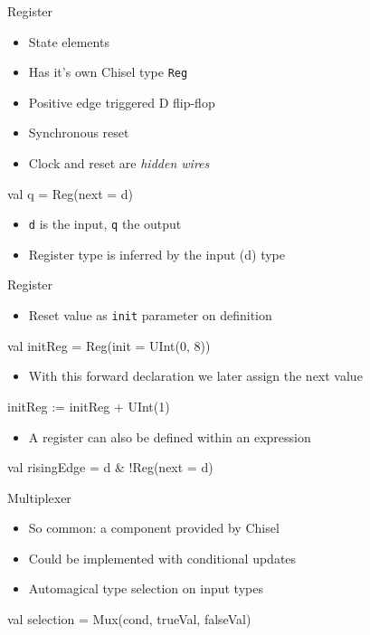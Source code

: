 \documentclass[xcolor=pdflatex,dvipsnames,table]{beamer}
\newcommand{\code}[1]{{\texttt{#1}}}
\begin{document}
\begin{frame}[fragile]{Register}
\begin{itemize}
\item State elements
\item Has it's own Chisel type \code{Reg}
\item Positive edge triggered D flip-flop
\item Synchronous reset
\item Clock and reset are \emph{hidden wires}
\end{itemize}
\begin{chisel}
val q = Reg(next = d)
\end{chisel}
\begin{itemize}
\item \code{d} is the input, \code{q} the output
\item Register type is inferred by the input (d) type
\end{itemize}
\end{frame}

\begin{frame}[fragile]{Register}
\begin{itemize}
\item Reset value as \code{init} parameter on definition
\end{itemize}
\begin{chisel}
val initReg = Reg(init = UInt(0, 8))
\end{chisel}
\begin{itemize}
\item With this forward declaration we later assign the next value
\end{itemize}
\begin{chisel}
initReg := initReg + UInt(1)
\end{chisel}
\begin{itemize}
\item A register can also be defined within an expression
\end{itemize}
\begin{chisel}
val risingEdge = d & !Reg(next = d)
\end{chisel}
\end{frame}

\begin{frame}[fragile]{Multiplexer}
\begin{itemize}
\item So common: a component provided by Chisel
\item Could be implemented with conditional updates
\item Automagical type selection on input types
\end{itemize}
\begin{chisel}
val selection = Mux(cond, trueVal, falseVal)
\end{chisel}
\end{frame}
\end{document}
